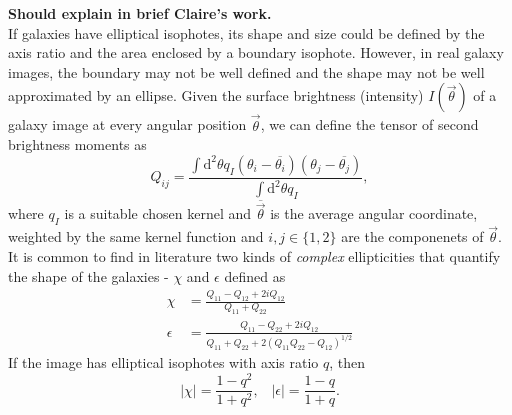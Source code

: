 \documentclass[twocolumn,useAMS,usenatbib]{mn2e}
\newcommand{\rmd}{\mathrm{d}}
\begin{document}
{\bf Should explain in brief Claire's work.} \\
If galaxies have elliptical isophotes, its shape and size could be defined by the axis ratio and the area enclosed by a boundary isophote. However, in real galaxy images,
the boundary may not be well defined and the shape may not be well approximated by an ellipse. Given the surface brightness (intensity) $I(\vec{\theta})$ of a galaxy image at every angular position $\vec{\theta}$,
we can define the tensor of second brightness moments as
\begin{equation}
 Q_{ij} = \frac{\int\rmd^2\theta q_I (\theta_i - \overline{\theta_i})(\theta_j - \overline{\theta_j})}{\int\rmd^2\theta q_I},
\end{equation}
where $q_I$ is a suitable chosen kernel and $\overline{\vec{\theta}}$ is the average angular coordinate, weighted by the same kernel function and $i,j\in\lbrace 1,2 \rbrace$ are the componenets of $\vec{\theta}$.
It is common to find in literature two kinds of \emph{complex }ellipticities that quantify the shape of the galaxies - $\chi$ and $\epsilon$ defined as
\begin{align}
 \chi &= \frac{Q_{11}-Q_{12}+2iQ_{12}}{Q_{11}+Q_{22}} \\ \epsilon &= \frac{Q_{11}-Q_{22}+2iQ_{12}}{Q_{11}+Q_{22}+2(Q_{11}Q_{22}-Q_{12})^{1/2}}
\end{align}
If the image has elliptical isophotes with axis ratio $q$, then 
\begin{equation}
 |\chi| = \frac{1-q^2}{1+q^2}, \;\;\; |\epsilon| = \frac{1-q}{1+q}. 
\end{equation}
\end{document}
